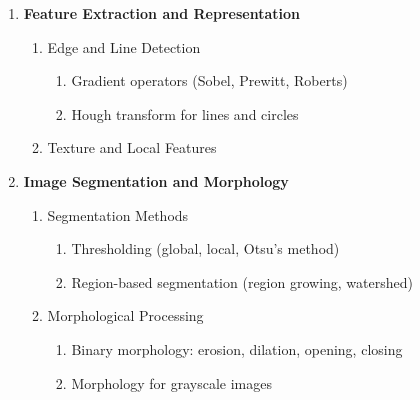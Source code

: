 \documentclass[a4paper,10pt]{article}
\begin{document}
\begin{enumerate}[label=\Roman*.]
    \item \textbf{Feature Extraction and Representation}
    \begin{enumerate}[label=\alph*.]
        \item Edge and Line Detection
        \begin{enumerate}[label=\roman*.]
            \item Gradient operators (Sobel, Prewitt, Roberts)
            \item Hough transform for lines and circles
        \end{enumerate}
        \item Texture and Local Features
    \end{enumerate}

    \item \textbf{Image Segmentation and Morphology}
    \begin{enumerate}[label=\alph*.]
        \item Segmentation Methods
        \begin{enumerate}[label=\roman*.]
            \item Thresholding (global, local, Otsu's method)
            \item Region-based segmentation (region growing, watershed)
        \end{enumerate}
        \item Morphological Processing
        \begin{enumerate}[label=\roman*.]
            \item Binary morphology: erosion, dilation, opening, closing
            \item Morphology for grayscale images
        \end{enumerate}
    \end{enumerate}


\end{enumerate}
\end{document}
